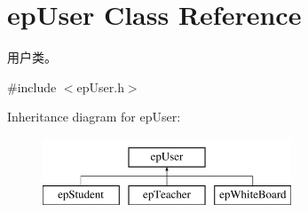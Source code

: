 \hypertarget{classepUser}{\section{ep\-User \-Class \-Reference}
\label{classepUser}
}


用户类。  




{\ttfamily \#include $<$ep\-User.\-h$>$}

\-Inheritance diagram for ep\-User\-:\begin{figure}[H]
\begin{center}
\leavevmode
\includegraphics[height=2.000000cm]{classepUser}
\end{center}
\end{figure}
